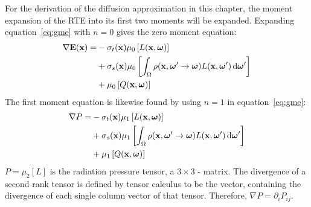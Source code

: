 For the derivation of the diffusion approximation in this chapter, the moment expansion of the RTE into its first two moments will be expanded. Expanding equation~\ref{eq:gme} with $n=0$ gives the zero moment equation:
\begin{align}
\nonumber
\nabla\boldsymbol{\mathbf{E}}(\boldsymbol{\mathbf{x}})=&
-\sigma_t(\boldsymbol{\mathbf{x}})\mu_0\left[L(\boldsymbol{\mathbf{x}}, \boldsymbol{\mathbf{\omega}})\right]
\\
\label{eq:p1_zero}
&+ \sigma_s(\boldsymbol{\mathbf{x}})\mu_0\left[\int_{\Omega}\rho(\boldsymbol{\mathbf{x}}, \boldsymbol{\mathbf{\omega}}'\rightarrow\boldsymbol{\mathbf{\omega}})L(\boldsymbol{\mathbf{x}}, \boldsymbol{\mathbf{\omega}}')\,\mathrm{d}\boldsymbol{\mathbf{\omega}}'\right] 
\\
\nonumber
&+ \mu_0\left[Q(\boldsymbol{\mathbf{x}}, \boldsymbol{\mathbf{\omega}})\right]
\end{align}
The first moment equation is likewise found by using $n=1$ in equation~\ref{eq:gme}:
\begin{align}
\nonumber
\nabla P =&
-\sigma_t(\boldsymbol{\mathbf{x}})\mu_1\left[L(\boldsymbol{\mathbf{x}}, \boldsymbol{\mathbf{\omega}})\right]
\\ &
\label{eq:p1_firstme}
+\sigma_s(\boldsymbol{\mathbf{x}})\mu_1\left[\int_{\Omega}\rho(\boldsymbol{\mathbf{x}}, \boldsymbol{\mathbf{\omega}}'\rightarrow\boldsymbol{\mathbf{\omega}})L(\boldsymbol{\mathbf{x}}, \boldsymbol{\mathbf{\omega}}')\,\mathrm{d}\boldsymbol{\mathbf{\omega}}'\right]
\\ &
\nonumber
+ \mu_1\left[Q(\boldsymbol{\mathbf{x}}, \boldsymbol{\mathbf{\omega}})\right]
\end{align}
$P=\mu_2[L]$ is the radiation pressure tensor, a $3\times3$ - matrix. The divergence of a second rank tensor is defined by tensor calculus to be the vector, containing the divergence of each single column vector of that tensor. Therefore, $\nabla P = \partial_i P_{ij}$.

